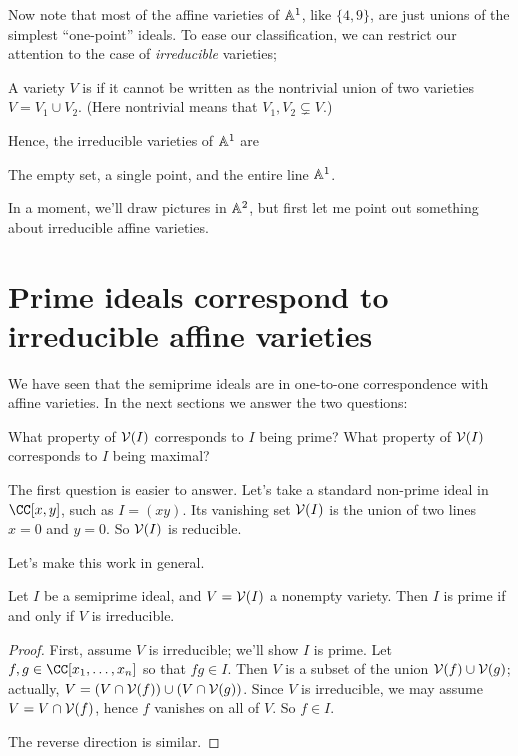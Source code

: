 \documentclass[11pt]{scrreprt}
\begin{document}
Now note that most of the affine varieties of $\mathbb A^1$, like $\{4,9\}$,
are just unions of the simplest ``one-point'' ideals.
To ease our classification,
we can restrict our attention to the case of \emph{irreducible} varieties;
\begin{definition}
	A variety $V$ is  if it cannot be written
	as the nontrivial union of two varieties $V = V_1 \cup V_2$.
	(Here nontrivial means that $V_1, V_2 \subsetneq V$.)
\end{definition}

Hence, the irreducible varieties of $\mathbb A^1$ are
\begin{enumerate}[(i)]
	\ii The empty set,
	\ii a single point, and
	\ii the entire line $\mathbb A^1$.
\end{enumerate}

In a moment, we'll draw pictures in $\mathbb A^2$,
but first let me point out something about irreducible affine varieties.

\section{Prime ideals correspond to irreducible affine varieties}
We have seen that the semiprime ideals are in one-to-one correspondence with affine varieties.
In the next sections we answer the two questions:
\begin{itemize}
	\ii What property of $\mathcal V(I)$ corresponds to $I$ being prime?
	\ii What property of $\mathcal V(I)$ corresponds to $I$ being maximal?
\end{itemize}
The first question is easier to answer.
Let's take a standard non-prime ideal in $\CC[x,y]$, such as $I = (xy)$.
Its vanishing set $\mathcal V(I)$ is the union of two lines $x=0$ and $y=0$.
So $\mathcal V(I)$ is reducible.

Let's make this work in general.
\begin{theorem}
	Let $I$ be a semiprime ideal, and $V = \mathcal V(I)$ a nonempty variety.
	Then $I$ is prime if and only if $V$ is irreducible.
\end{theorem}
\begin{proof}
	First, assume $V$ is irreducible; we'll show $I$ is prime.
	Let $f,g \in \CC[x_1, \dots, x_n]$ so that $fg \in I$.
	Then $V$ is a subset of the union $\mathcal V(f) \cup \mathcal V(g)$;
	actually, $V = \left( V \cap \mathcal V(f) \right) \cup \left( V \cap \mathcal V(g) \right)$.
	Since $V$ is irreducible, we may assume $V = V \cap \mathcal V(f)$,
	hence $f$ vanishes on all of $V$. So $f \in I$.

	The reverse direction is similar.
\end{proof}
\end{document}
